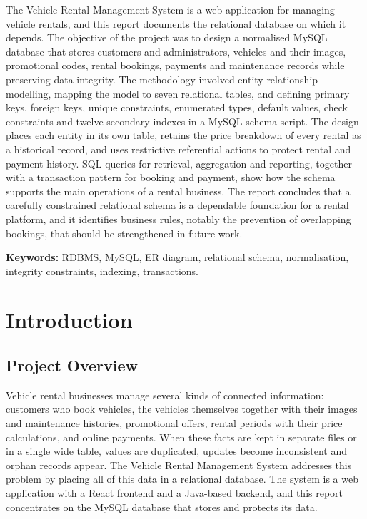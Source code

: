 \documentclass[10pt,a4paper]{report}
\begin{document}
The Vehicle Rental Management System is a web application for managing vehicle rentals, and this report documents the relational database on which it depends. The objective of the project was to design a normalised MySQL database that stores customers and administrators, vehicles and their images, promotional codes, rental bookings, payments and maintenance records while preserving data integrity. The methodology involved entity-relationship modelling, mapping the model to seven relational tables, and defining primary keys, foreign keys, unique constraints, enumerated types, default values, check constraints and twelve secondary indexes in a MySQL schema script. The design places each entity in its own table, retains the price breakdown of every rental as a historical record, and uses restrictive referential actions to protect rental and payment history. SQL queries for retrieval, aggregation and reporting, together with a transaction pattern for booking and payment, show how the schema supports the main operations of a rental business. The report concludes that a carefully constrained relational schema is a dependable foundation for a rental platform, and it identifies business rules, notably the prevention of overlapping bookings, that should be strengthened in future work.

\bigskip
\noindent\textbf{Keywords:} RDBMS, MySQL, ER diagram, relational schema, normalisation, integrity constraints, indexing, transactions.

\tableofcontents

\chapter{Introduction}

\section{Project Overview}
Vehicle rental businesses manage several kinds of connected information: customers who book vehicles, the vehicles themselves together with their images and maintenance histories, promotional offers, rental periods with their price calculations, and online payments. When these facts are kept in separate files or in a single wide table, values are duplicated, updates become inconsistent and orphan records appear. The Vehicle Rental Management System addresses this problem by placing all of this data in a relational database. The system is a web application with a React frontend and a Java-based backend, and this report concentrates on the MySQL database that stores and protects its data.
\end{document}

